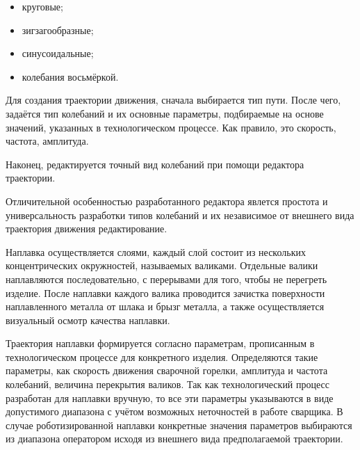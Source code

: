 \begin{itemize}
    \item круговые;
    \item зигзагообразные;
    \item синусоидальные;
    \item колебания восьмёркой.
\end{itemize}

Для создания траектории движения, сначала выбирается тип пути.
После чего, задаётся тип колебаний и их основные параметры, подбираемые на основе значений, указанных в технологическом процессе.
Как правило, это скорость, частота, амплитуда.

Наконец, редактируется точный вид колебаний при помощи редактора траектории.

Отличительной особенностью разработанного редактора явлется простота и универсальность разработки типов колебаний и их независимое от внешнего вида траектория движения редактирование.

Наплавка осуществляется слоями, каждый слой состоит из нескольких концентрических окружностей, называемых валиками.
Отдельные валики наплавляются последовательно, с перерывами для того, чтобы не перегреть изделие.
После наплавки каждого валика проводится зачистка поверхности наплавленного металла от шлака и брызг металла, а также осуществляется визуальный осмотр качества наплавки.

Траектория наплавки формируется согласно параметрам, прописанным в технологическом процессе для конкретного изделия.
Определяются такие параметры, как скорость движения сварочной горелки, амплитуда и частота колебаний, величина перекрытия валиков.
Так как технологический процесс разработан для наплавки вручную, то все эти параметры указываются в виде допустимого диапазона с учётом возможных неточностей в работе сварщика.
В случае роботизированной наплавки конкретные значения параметров выбираются из диапазона оператором исходя из внешнего вида предполагаемой траектории.


